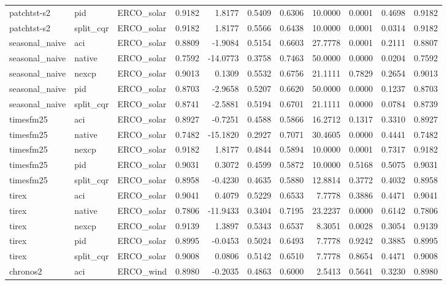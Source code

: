 \begin{tabular}{lllrrrrrrrr}
patchtst-s2 & pid & ERCO_solar & 0.9182 & 1.8177 & 0.5409 & 0.6306 & 10.0000 & 0.0001 & 0.4698 & 0.9182 \\
patchtst-s2 & split_cqr & ERCO_solar & 0.9182 & 1.8177 & 0.5566 & 0.6438 & 10.0000 & 0.0001 & 0.0314 & 0.9182 \\
seasonal_naive & aci & ERCO_solar & 0.8809 & -1.9084 & 0.5154 & 0.6603 & 27.7778 & 0.0001 & 0.2111 & 0.8807 \\
seasonal_naive & native & ERCO_solar & 0.7592 & -14.0773 & 0.3758 & 0.7463 & 50.0000 & 0.0000 & 0.0204 & 0.7592 \\
seasonal_naive & nexcp & ERCO_solar & 0.9013 & 0.1309 & 0.5532 & 0.6756 & 21.1111 & 0.7829 & 0.2654 & 0.9013 \\
seasonal_naive & pid & ERCO_solar & 0.8703 & -2.9658 & 0.5207 & 0.6620 & 50.0000 & 0.0000 & 0.1237 & 0.8703 \\
seasonal_naive & split_cqr & ERCO_solar & 0.8741 & -2.5881 & 0.5194 & 0.6701 & 21.1111 & 0.0000 & 0.0784 & 0.8739 \\
timesfm25 & aci & ERCO_solar & 0.8927 & -0.7251 & 0.4588 & 0.5866 & 16.2712 & 0.1317 & 0.3310 & 0.8927 \\
timesfm25 & native & ERCO_solar & 0.7482 & -15.1820 & 0.2927 & 0.7071 & 30.4605 & 0.0000 & 0.4441 & 0.7482 \\
timesfm25 & nexcp & ERCO_solar & 0.9182 & 1.8177 & 0.4844 & 0.5894 & 10.0000 & 0.0001 & 0.7317 & 0.9182 \\
timesfm25 & pid & ERCO_solar & 0.9031 & 0.3072 & 0.4599 & 0.5872 & 10.0000 & 0.5168 & 0.5075 & 0.9031 \\
timesfm25 & split_cqr & ERCO_solar & 0.8958 & -0.4230 & 0.4635 & 0.5880 & 12.8814 & 0.3772 & 0.4032 & 0.8958 \\
tirex & aci & ERCO_solar & 0.9041 & 0.4079 & 0.5229 & 0.6533 & 7.7778 & 0.3886 & 0.4471 & 0.9041 \\
tirex & native & ERCO_solar & 0.7806 & -11.9433 & 0.3404 & 0.7195 & 23.2237 & 0.0000 & 0.6142 & 0.7806 \\
tirex & nexcp & ERCO_solar & 0.9139 & 1.3897 & 0.5343 & 0.6537 & 8.3051 & 0.0028 & 0.3054 & 0.9139 \\
tirex & pid & ERCO_solar & 0.8995 & -0.0453 & 0.5024 & 0.6493 & 7.7778 & 0.9242 & 0.3885 & 0.8995 \\
tirex & split_cqr & ERCO_solar & 0.9008 & 0.0806 & 0.5142 & 0.6510 & 7.7778 & 0.8654 & 0.4471 & 0.9008 \\
chronos2 & aci & ERCO_wind & 0.8980 & -0.2035 & 0.4863 & 0.6000 & 2.5413 & 0.5641 & 0.3230 & 0.8980 \\

\end{tabular}
